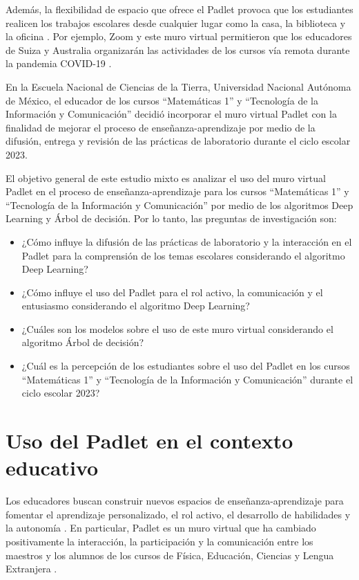 \documentclass[spanish]{textolivre}
\begin{document}
Además, la flexibilidad de espacio que ofrece el Padlet provoca que los estudiantes realicen los trabajos escolares desde cualquier lugar como la casa, la biblioteca y la oficina \cite{almwzaiji2022,bergaoui2023,olaniyi2020,turner2023,zhu2021}. Por ejemplo, Zoom y este muro virtual permitieron que los educadores de Suiza y Australia organizarán las actividades de los cursos vía remota durante la pandemia COVID-19 \cite{turner2023}.

En la Escuela Nacional de Ciencias de la Tierra, Universidad Nacional Autónoma de México, el educador de los cursos “Matemáticas 1” y “Tecnología de la Información y Comunicación” decidió incorporar el muro virtual Padlet con la finalidad de mejorar el proceso de enseñanza-aprendizaje por medio de la difusión, entrega y revisión de las prácticas de laboratorio durante el ciclo escolar 2023. 

El objetivo general de este estudio mixto es analizar el uso del muro virtual Padlet en el proceso de enseñanza-aprendizaje para los cursos “Matemáticas 1” y “Tecnología de la Información y Comunicación” por medio de los algoritmos Deep Learning y Árbol de decisión. Por lo tanto, las preguntas de investigación son:

\begin{itemize}
    \item ¿Cómo influye la difusión de las prácticas de laboratorio y la interacción en el Padlet para la comprensión de los temas escolares considerando el algoritmo Deep Learning?
    \item ¿Cómo influye el uso del Padlet para el rol activo, la comunicación y el entusiasmo considerando el algoritmo Deep Learning?
    \item ¿Cuáles son los modelos sobre el uso de este muro virtual considerando el algoritmo Árbol de decisión?
    \item ¿Cuál es la percepción de los estudiantes sobre el uso del Padlet en los cursos “Matemáticas 1” y “Tecnología de la Información y Comunicación” durante el ciclo escolar 2023?
\end{itemize}


\section{Uso del Padlet en el contexto educativo}\label{sec-normas}
Los educadores buscan construir nuevos espacios de enseñanza-aprendizaje para fomentar el aprendizaje personalizado, el rol activo, el desarrollo de habilidades y la autonomía \cite{lee2023,olaniyi2020,siantuba2023}. En particular, Padlet es un muro virtual que ha cambiado positivamente la interacción, la participación y la comunicación entre los maestros y los alumnos de los cursos de Física, Educación, Ciencias y Lengua Extranjera \cite{almwzaiji2022,lee2023,olaniyi2020,siantuba2023,zhu2021}.
\end{document}
